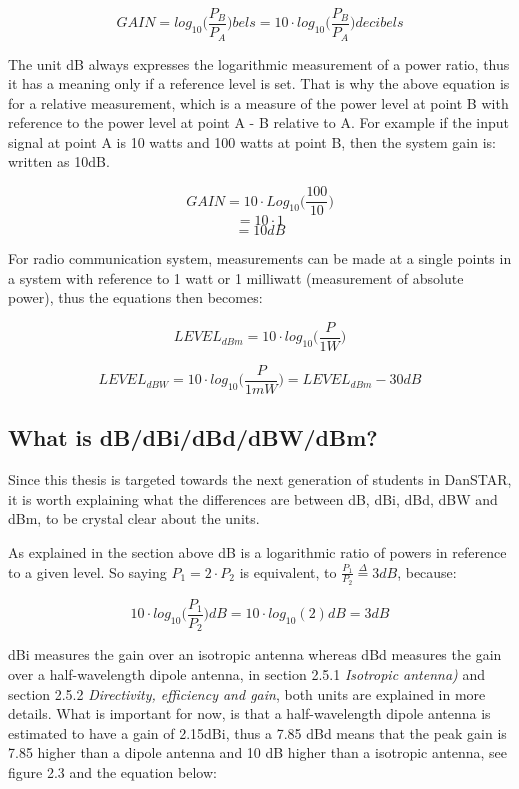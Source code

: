 \begin{equation}
    GAIN = log_{10}\Big(\frac{P_B}{P_A}\Big)bels = 10 \cdot log_{10}\Big(\frac{P_B}{P_A}\Big)decibels
\end{equation}

The unit dB always expresses the logarithmic measurement of a power ratio, thus it has a meaning only if a reference level is set. That is why the above equation is for a relative measurement, which is a measure of the power level at point B with reference to the power level at point A - B relative to A. For example if the input signal at point A is 10 watts and 100 watts at point B, then the system gain is: written as 10dB. 

$$GAIN = 10 \cdot Log_{10}\Big(\frac{100}{10}\Big)$$
$$= 10 \cdot 1$$
$$= 10dB$$

For radio communication system, measurements can be made at a single points in a system with reference to 1 watt or 1 milliwatt (measurement of absolute power), thus the equations then becomes:

\begin{equation}
    LEVEL_{dBm} = 10 \cdot log_{10}\Big(\frac{P}{1W}\Big)
\end{equation}

\begin{equation}
    LEVEL_{dBW} = 10 \cdot log_{10}\Big(\frac{P}{1mW}\Big) = LEVEL_{dBm}-30dB
\end{equation}

\subsection{What is dB/dBi/dBd/dBW/dBm?}
Since this thesis is targeted towards the next generation of students in DanSTAR, it is worth explaining what the differences are between dB, dBi, dBd, dBW and dBm, to be crystal clear about the units. 

As explained in the section above dB is a logarithmic ratio of powers in reference to a given level. So saying $P_1 = 2 \cdot P_2$ is equivalent, to $\frac{P_1}{P_2}\overset{\Delta}{=} 3 dB$, because: 

\begin{equation}
    10 \cdot log_{10}\Big(\frac{P_1}{P_2}\Big)dB = 10 \cdot log_{10}(2)dB = 3dB
\end{equation}

dBi measures the gain over an isotropic antenna whereas dBd measures the gain over a half-wavelength dipole antenna, in section 2.5.1 \textit{Isotropic antenna)} and section 2.5.2 \textit{Directivity, efficiency and gain}, both units are explained in more details. What is important for now, is that a half-wavelength dipole antenna is estimated to have a gain of 2.15dBi, thus a 7.85 dBd means that the peak gain is 7.85 higher than a dipole antenna and 10 dB higher than a isotropic antenna, see figure 2.3 and the equation below:

